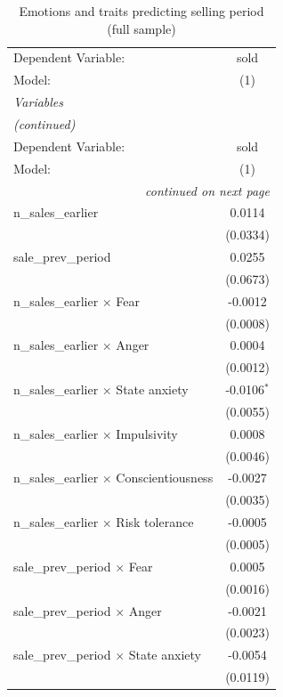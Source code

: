 
\begingroup
\scriptsize
\begin{longtable}{lc}
\caption{Emotions and traits predicting selling period (full sample)} \\
   \midrule \midrule
   Dependent Variable: & sold\\
   Model:              & (1)\\
   \midrule
   \emph{Variables}\\
\endfirsthead
\multicolumn{2}{l}{\emph{(continued)}}\\
   \midrule \midrule
   Dependent Variable: & sold\\
   Model:              & (1)\\
   \midrule
\endhead
   \midrule
   \multicolumn{2}{r}{\emph{continued on next page}}\\
\endfoot
\endlastfoot
   n\_sales\_earlier   & 0.0114\\
                       & (0.0334)\\
   sale\_prev\_period  & 0.0255\\
                       & (0.0673)\\
   n\_sales\_earlier $\times$ Fear& -0.0012\\
                       & (0.0008)\\
   n\_sales\_earlier $\times$ Anger& 0.0004\\
                       & (0.0012)\\
   n\_sales\_earlier $\times$ State anxiety& -0.0106$^{*}$\\
                       & (0.0055)\\
   n\_sales\_earlier $\times$ Impulsivity& 0.0008\\
                       & (0.0046)\\
   n\_sales\_earlier $\times$ Conscientiousness& -0.0027\\
                       & (0.0035)\\
   n\_sales\_earlier $\times$ Risk tolerance& -0.0005\\
                       & (0.0005)\\
   sale\_prev\_period $\times$ Fear& 0.0005\\
                       & (0.0016)\\
   sale\_prev\_period $\times$ Anger& -0.0021\\
                       & (0.0023)\\
   sale\_prev\_period $\times$ State anxiety& -0.0054\\
                       & (0.0119)\\

\end{longtable}

